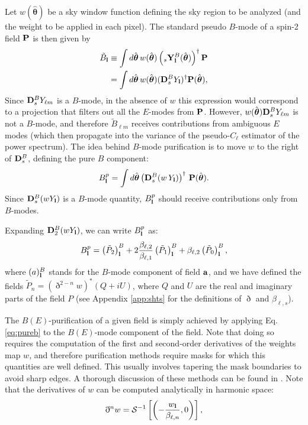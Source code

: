 \documentclass[usenatbib]{mnrasb}
\newcommand{\nv}{\hat{\boldsymbol{\theta}}}
\begin{document}
      Let $w(\nv)$ be a sky window function defining the sky region to be analyzed (and the weight to be applied in each pixel). The standard pseudo $B$-mode of a spin-2 field ${\bf P}$ is then given by
      \begin{align}\nonumber
        \tilde{B}_{\bf l}&\equiv\int d\nv\,w(\nv)\left(_s{\bf Y}^{B}_{\bf l}(\nv)\right)^\dag{\bf P}\\
                         &=\int d\nv\,w(\nv)({\bf D}^B_sY_{\bf l})^\dag{\bf P}(\nv),
      \end{align}
      Since ${\bf D}^B_sY_{\ell m}$ is a $B$-mode, in the absence of $w$ this expression would correspond to a projection that filters out all the $E$-modes from ${\bf P}$. However, $w(\nv){\bf D}^B_sY_{\ell m}$ is not a $B$-mode, and therefore $\tilde{B}_{\ell m}$ receives contributions from ambiguous $E$ modes (which then propagate into the variance of the pseudo-$C_\ell$ estimator of the power spectrum). The idea behind $B$-mode purification is to move $w$ to the right of ${\bf D}^B_s$, defining the pure $B$ component:
      \begin{equation}
        B^p_{\bf l}=\int d\nv\left({\bf D}^B_s(w\,Y_{\bf l})\right)^\dag\,{\bf P}(\nv).
      \end{equation}
      Since ${\bf D}^B_s(wY_{\bf l})$ is a $B$-mode quantity, $B^p_{\bf l}$ should receive contributions only from $B$-modes.
  
      Expanding ${\bf D}^B_2(wY_{\bf l})$, we can write $B^p_{\bf l}$ as:
      \begin{equation}\label{eq:pureb}
        B^p_{\bf l}=\left(\tilde{P}_2\right)^B_{\bf l}+2\frac{\beta_{\ell,2}}{\beta_{\ell,1}}\left(\tilde{P}_1\right)^B_{\bf l}+\beta_{\ell,2}\left(\tilde{P}_0\right)^B_{\bf l},
      \end{equation}
      where $(a)^B_{\bf l}$ stands for the $B$-mode component of field ${\bf a}$, and we have defined the fields $\tilde{P}_n=(\eth^{2-n}w)^*(Q+iU)$, where $Q$ and $U$ are the real and imaginary parts of the field $P$ (see Appendix \ref{app:shts} for the definitions of $\eth$ and $\beta_{\ell,s}$).
     
      The $B(E)$-purification of a given field is simply achieved by applying Eq. \ref{eq:pureb} to the $B(E)$-mode component of the field. Note that doing so requires the computation of the first and second-order derivatives of the weights map $w$, and therefore purification methods require masks for which this quantities are well defined. This usually involves tapering the mask boundaries to avoid sharp edges. A thorough discussion of these methods can be found in \cite{2009PhRvD..79l3515G}. Note that the derivatives of $w$ can be computed analytically in harmonic space:
      \begin{align}
        \eth^nw={\cal S}^{-1}\left[\left(-\frac{w_{\bf l}}{\beta_{\ell,n}},0\right)\right],
      \end{align}
      
\end{document}
